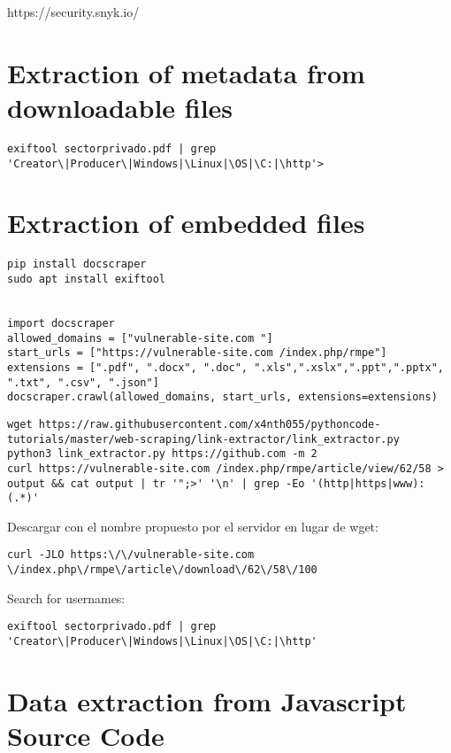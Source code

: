 https://security.snyk.io/



\section{Extraction of metadata from downloadable files}

\begin{lstlisting}[numbers=none]
exiftool sectorprivado.pdf | grep 'Creator\|Producer\|Windows|\Linux|\OS|\C:|\http'>
\end{lstlisting}

\section{Extraction of embedded files}

\begin{lstlisting}[numbers=none]
pip install docscraper 
sudo apt install exiftool


import docscraper 
allowed_domains = ["vulnerable-site.com "]
start_urls = ["https://vulnerable-site.com /index.php/rmpe"]
extensions = [".pdf", ".docx", ".doc", ".xls",".xslx",".ppt",".pptx", ".txt", ".csv", ".json"]
docscraper.crawl(allowed_domains, start_urls, extensions=extensions)
\end{lstlisting}

\begin{lstlisting}[numbers=none]
wget https://raw.githubusercontent.com/x4nth055/pythoncode-tutorials/master/web-scraping/link-extractor/link_extractor.py
python3 link_extractor.py https://github.com -m 2
curl https://vulnerable-site.com /index.php/rmpe/article/view/62/58 > output && cat output | tr '";>' '\n' | grep -Eo '(http|https|www):(.*)'
\end{lstlisting}

Descargar con el nombre propuesto por el servidor en lugar de wget:
\begin{lstlisting}[numbers=none]
curl -JLO https:\/\/vulnerable-site.com \/index.php\/rmpe\/article\/download\/62\/58\/100
\end{lstlisting}

Search for usernames:
\begin{lstlisting}[numbers=none]
exiftool sectorprivado.pdf | grep 'Creator\|Producer\|Windows|\Linux|\OS|\C:|\http'
\end{lstlisting}


\section{Data extraction from Javascript Source Code}

